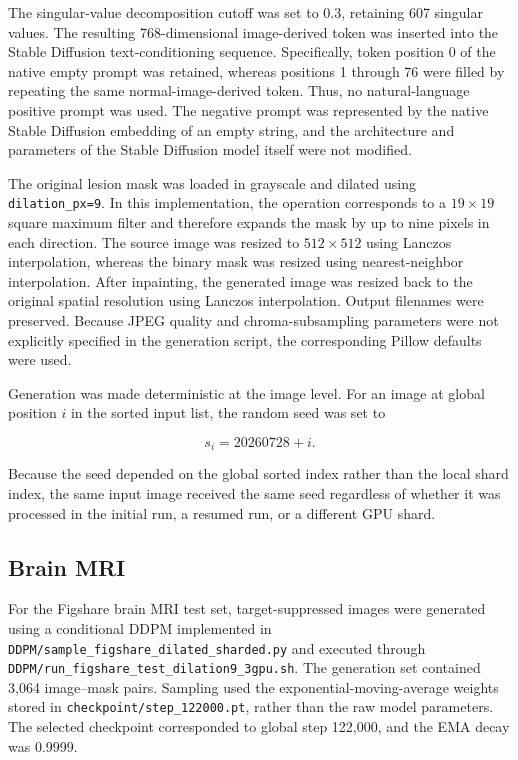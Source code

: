 The singular-value decomposition cutoff was set to 0.3, retaining 607 singular values. The resulting 768-dimensional image-derived token was inserted into the Stable Diffusion text-conditioning sequence. Specifically, token position 0 of the native empty prompt was retained, whereas positions 1 through 76 were filled by repeating the same normal-image-derived token. Thus, no natural-language positive prompt was used. The negative prompt was represented by the native Stable Diffusion embedding of an empty string, and the architecture and parameters of the Stable Diffusion model itself were not modified.

The original lesion mask was loaded in grayscale and dilated using \texttt{dilation\_px=9}. In this implementation, the operation corresponds to a $19 \times 19$ square maximum filter and therefore expands the mask by up to nine pixels in each direction. The source image was resized to $512 \times 512$ using Lanczos interpolation, whereas the binary mask was resized using nearest-neighbor interpolation. After inpainting, the generated image was resized back to the original spatial resolution using Lanczos interpolation. Output filenames were preserved. Because JPEG quality and chroma-subsampling parameters were not explicitly specified in the generation script, the corresponding Pillow defaults were used.

Generation was made deterministic at the image level. For an image at global position $i$ in the sorted input list, the random seed was set to

\[
s_i = 20260728 + i.
\]

Because the seed depended on the global sorted index rather than the local shard index, the same input image received the same seed regardless of whether it was processed in the initial run, a resumed run, or a different GPU shard.

\subsection{Brain MRI}

For the Figshare brain MRI test set, target-suppressed images were generated using a conditional DDPM implemented in \texttt{DDPM/sample\_figshare\_dilated\_sharded.py} and executed through \texttt{DDPM/run\_figshare\_test\_dilation9\_3gpu.sh}. The generation set contained 3,064 image--mask pairs. Sampling used the exponential-moving-average weights stored in \texttt{checkpoint/step\_122000.pt}, rather than the raw model parameters. The selected checkpoint corresponded to global step 122,000, and the EMA decay was 0.9999.


